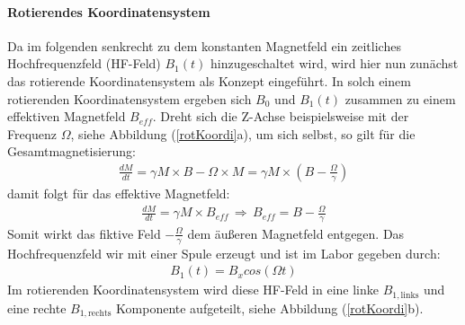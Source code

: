 \paragraph{Rotierendes Koordinatensystem}
Da im folgenden senkrecht zu dem konstanten Magnet\-feld ein zeitliches Hochfrequenzfeld (HF-Feld) $B_1(t)$ hinzugeschaltet wird, wird hier nun zun\"{a}chst das rotierende Koordinatensystem als Konzept eingef\"{u}hrt.
In solch einem rotierenden Koordinatensystem ergeben sich $B_0$ und $B_1(t)$ zusammen zu einem effektiven Magnetfeld $B_{eff}$.
Dreht sich die Z-Achse beispielsweise mit der Frequenz $\Omega$, siehe Abbildung (\ref{rotKoordi}a), um sich selbst, so gilt f\"{u}r die Gesamtmagnetisierung:
\begin{align*}
	\frac{dM}{dt} = \gamma M \times B - \Omega \times M = \gamma M \times \left(B - \frac{\Omega}{\gamma} \right)
\end{align*}
damit folgt f\"{u}r das effektive Magnetfeld:
\begin{align*}
	\frac{dM}{dt} = \gamma M \times B_{eff} \, \Rightarrow \, B_{eff} = B - \frac{\Omega}{\gamma}
\end{align*}
Somit wirkt das fiktive Feld $- \frac{\Omega}{\gamma}$ dem \"{a}u{\ss}eren Magnetfeld entgegen.
Das Hochfrequenzfeld wir mit einer Spule erzeugt und ist im Labor gegeben durch:
\begin{align*}
	B_1(t) = B_x cos(\Omega t)
\end{align*}
Im rotierenden Koordinatensystem wird diese HF-Feld in eine linke $B_{1,\text{links}}$ und eine rechte $B_{1,\text{rechts}}$ Komponente aufgeteilt, siehe Abbildung (\ref{rotKoordi}b).
